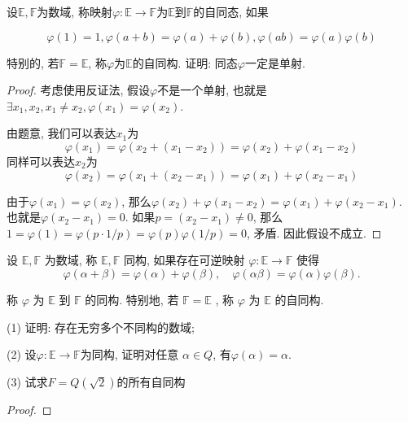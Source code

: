     \begin{prob}
        设$\mathbb{E,F}$为数域, 称映射$\varphi: \mathbb{E}\rightarrow \mathbb{F}$为$\mathbb{E}$到$\mathbb{F}$的自同态, 如果

        $$\varphi(1)=1, \varphi(a+b)=\varphi(a)+\varphi(b),\varphi(ab)=\varphi(a)\varphi(b)$$

        特别的, 若$\mathbb{F}=\mathbb{E}$, 称$\varphi$为$\mathbb{E}$的自同构. 证明: 同态$\varphi$一定是单射. 
    \end{prob}

    \begin{proof}
        考虑使用反证法, 假设$\varphi$不是一个单射, 也就是$\exists x_1,x_2, x_1 \neq x_2, \varphi(x_1) = \varphi(x_2)$.

        由题意, 我们可以表达$x_1$为
        $$
        \varphi(x_1)=\varphi(x_2+(x_1-x_2))=\varphi(x_2)+\varphi(x_1-x_2)
        $$
        同样可以表达$x_2$为
        $$
        \varphi(x_2)=\varphi(x_1+(x_2-x_1))=\varphi(x_1)+\varphi(x_2-x_1)
        $$

        由于$\varphi(x_1)=\varphi(x_2)$, 那么$\varphi(x_2)+\varphi(x_1-x_2)=\varphi(x_1)+\varphi(x_2-x_1)$. 也就是$\varphi(x_2-x_1)=0$. 如果$p=(x_2-x_1)\neq 0$, 那么$1=\varphi(1)=\varphi(p\cdot 1/p)=\varphi(p)\varphi(1/p)=0$, 矛盾. 因此假设不成立. 

        
    \end{proof}

    \begin{prob}
        设  $\mathbb{E}, \mathbb{F}$  为数域, 称  $\mathbb{E}, \mathbb{F}$  同构, 如果存在可逆映射  $\varphi: \mathbb{E} \rightarrow \mathbb{F}$  使得$$\varphi(\alpha+\beta)=\varphi(\alpha)+\varphi(\beta), \quad \varphi(\alpha \beta)=\varphi(\alpha) \varphi(\beta) .$$

        称  $\varphi$  为  $\mathbb{E}$  到  $\mathbb{F}$  的同构. 特别地, 若  $\mathbb{F}=\mathbb{E}$ , 称  $\varphi$  为  $\mathbb{E}$  的自同构.
        
        (1) 证明: 存在无穷多个不同构的数域;

        (2) 设$ \varphi:\mathbb{E} \rightarrow \mathbb{F} $为同构, 证明对任意 $\alpha \in Q$, 有$\varphi(\alpha)=\alpha$. 

        (3) 试求$F=Q(\sqrt{2})$的所有自同构
    \end{prob}

    \begin{proof}
    \end{proof}
    


